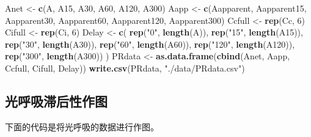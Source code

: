 \documentclass[
]{krantz}
\makeatletter
\newenvironment{Shaded}{\begin{snugshade}}{\end{snugshade}}
\newcommand{\DecValTok}[1]{\textcolor[rgb]{0.00,0.00,0.81}{#1}}
\newcommand{\KeywordTok}[1]{\textcolor[rgb]{0.13,0.29,0.53}{\textbf{#1}}}
\newcommand{\NormalTok}[1]{#1}
\newcommand{\StringTok}[1]{\textcolor[rgb]{0.31,0.60,0.02}{#1}}
\newenvironment{kframe}{%
\medskip{}
\setlength{\fboxsep}{.8em}
 \def\at@end@of@kframe{}%
 \ifinner\ifhmode%
  \def\at@end@of@kframe{\end{minipage}}%
  \begin{minipage}{\columnwidth}%
 \fi\fi%
 \def\FrameCommand##1{\hskip\@totalleftmargin \hskip-\fboxsep
 \colorbox{shadecolor}{##1}\hskip-\fboxsep
     \hskip-\linewidth \hskip-\@totalleftmargin \hskip\columnwidth}%
 \MakeFramed {\advance\hsize-\width
   \@totalleftmargin\z@ \linewidth\hsize
   \@setminipage}}%
 {\par\unskip\endMakeFramed%
 \at@end@of@kframe}
\renewenvironment{Shaded}{\begin{kframe}}{\end{kframe}}
\makeatother
\begin{document}
\begin{Shaded}
\begin{Highlighting}[]
\NormalTok{Anet <-}\StringTok{ }\KeywordTok{c}\NormalTok{(A, A15, A30, A60, A120, A300)}
\NormalTok{Aapp <-}
\StringTok{  }\KeywordTok{c}\NormalTok{(Aapparent,}
\NormalTok{    Aapparent15,}
\NormalTok{    Aapparent30,}
\NormalTok{    Aapparent60,}
\NormalTok{    Aapparent120,}
\NormalTok{    Aapparent300)}
\NormalTok{Ccfull <-}\StringTok{ }\KeywordTok{rep}\NormalTok{(Cc, }\DecValTok{6}\NormalTok{)}
\NormalTok{Cifull <-}\StringTok{ }\KeywordTok{rep}\NormalTok{(Ci, }\DecValTok{6}\NormalTok{)}
\NormalTok{Delay <-}
\StringTok{  }\KeywordTok{c}\NormalTok{(}
    \KeywordTok{rep}\NormalTok{(}\StringTok{"0"}\NormalTok{, }\KeywordTok{length}\NormalTok{(A)),}
    \KeywordTok{rep}\NormalTok{(}\StringTok{"15"}\NormalTok{, }\KeywordTok{length}\NormalTok{(A15)),}
    \KeywordTok{rep}\NormalTok{(}\StringTok{"30"}\NormalTok{, }\KeywordTok{length}\NormalTok{(A30)),}
    \KeywordTok{rep}\NormalTok{(}\StringTok{"60"}\NormalTok{, }\KeywordTok{length}\NormalTok{(A60)),}
    \KeywordTok{rep}\NormalTok{(}\StringTok{"120"}\NormalTok{, }\KeywordTok{length}\NormalTok{(A120)),}
    \KeywordTok{rep}\NormalTok{(}\StringTok{"300"}\NormalTok{, }\KeywordTok{length}\NormalTok{(A300))}
\NormalTok{  )}
\NormalTok{PRdata <-}\StringTok{ }\KeywordTok{as.data.frame}\NormalTok{(}\KeywordTok{cbind}\NormalTok{(Anet, Aapp, Ccfull, Cifull, Delay))}
\KeywordTok{write.csv}\NormalTok{(PRdata, }\StringTok{"./data/PRdata.csv"}\NormalTok{)}
\end{Highlighting}
\end{Shaded}

\hypertarget{multi5}{%
\subsection{光呼吸滞后性作图}\label{multi5}}

下面的代码是将光呼吸的数据进行作图。
\end{document}
